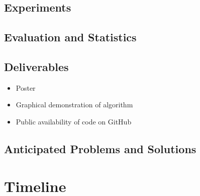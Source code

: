 \documentclass{article}
\begin{document}
\subsection{Experiments}
\subsection{Evaluation and Statistics}
\subsection{Deliverables}
\begin{itemize}
	\item Poster
	\item Graphical demonstration of algorithm
	\item Public availability of code on GitHub
\end{itemize}
\subsection{Anticipated Problems and Solutions}
\section{Timeline}
\end{document}
